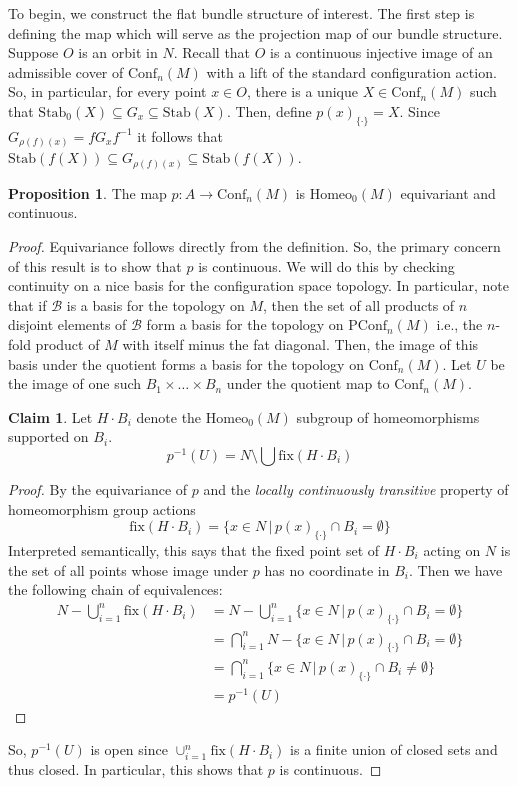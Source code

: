 \documentclass[10pt, oneside]{article}
\newcommand{\homeo}[1][S^1]{\text{Homeo}_0(#1)}
\newcommand{\conf}[2][S^1]{\text{Conf}_{#2}(#1)}
\newcommand{\pconf}[2][S^1]{\text{PConf}_{#2}(#1)}
\newcommand{\set}{{\{\cdot\}}}
\newcommand{\stab}[1]{\text{Stab}(#1)}
\newcommand{\pstab}[1]{\text{Stab}_0(#1)}
\theoremstyle{definition}
\newtheorem{prop}{Proposition}[section]
\newtheorem*{clm*}{Claim}
\theoremstyle{definition}
\begin{document}
To begin, we construct the flat bundle structure of interest. The first step is defining the map which will serve as the projection map of our bundle structure. Suppose $O$ is an orbit in $N$.
Recall that $O$ is a continuous injective image
of an admissible cover of $\conf[M]{n}$
with a lift of the standard configuration action.
So, in particular,
for every point $x\in O$,
there is a unique $X\in\conf[M]{n}$
such that $\pstab{X} \subseteq G_x \subseteq \stab{X}$.
Then, define $p(x)_\set = X$.
Since $G_{\rho(f)(x)} = f G_x f^{-1}$
it follows that $\stab{f(X)} \subseteq G_{\rho(f)(x)}\subseteq \stab{f(X)}$.

\begin{prop}
    The map $p: A\to \conf[M]{n}$ is $\homeo[M]$ equivariant and continuous.
\end{prop}
\begin{proof}
    Equivariance follows directly from the definition.
    So, the primary concern of this result is to show that $p$ is continuous.
    We will do this by checking continuity on a nice basis for the configuration space topology.
    In particular,
    note that if $\mathscr{B}$ is a basis for the topology on $M$,
    then the set of all products of $n$ disjoint elements of $\mathscr{B}$ form a basis for the topology on $\pconf[M]{n}$
    i.e., the $n$-fold product of $M$ with itself minus the fat diagonal.
    Then, the image of this basis under the quotient forms a basis for the topology on $\conf[M]{n}$.
    Let $U$ be the image of one such $B_1\times\dots\times B_n$
    under the quotient map to $\conf[M]{n}$.

    \begin{clm*}
        Let $H\cdot B_i$ denote the $\homeo[M]$ subgroup of homeomorphisms supported on $B_i$.
        $$p^{-1}(U) = N \setminus \bigcup \text{fix}(H\cdot B_i)$$
    \end{clm*}
    \begin{proof}
        By the equivariance of $p$
        and the \textit{locally continuously transitive} property of homeomorphism group actions
        $$\text{fix}(H\cdot B_i) = \{x\in N\, |\, p(x)_\set\cap B_i = \emptyset\}$$
        Interpreted semantically,
        this says that
        the fixed point set of $H\cdot B_i$ acting on $N$ is
        the set of all points whose image under $p$ has no coordinate in $B_i$.
        Then we have the following chain of equivalences:
        \begin{align*}
            N - \bigcup_{i=1}^n\text{fix}(H\cdot B_i) &= N - \bigcup_{i=1}^n\{x\in N\, |\, p(x)_\set\cap B_i = \emptyset\}\\
            &= \bigcap_{i=1}^n N - \{x\in N\, |\, p(x)_\set\cap B_i = \emptyset\}\\
            &= \bigcap_{i=1}^n \{x\in N\, |\, p(x)_\set\cap B_i \neq \emptyset\}\\
            &= p^{-1}(U)
        \end{align*}
    \end{proof}
    So,
    $p^{-1}(U)$ is open
    since $\cup_{i=1}^n\text{fix}(H\cdot B_i)$ is a finite union of closed sets
    and thus closed.
    In particular,
    this shows that $p$ is continuous.
\end{proof}
\end{document}
